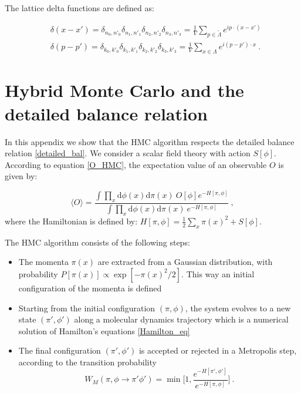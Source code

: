 The lattice delta functions are defined as:

\begin{equation}
\begin{split}
& \delta(x-x') =  \delta_{n_0,n'_0} \delta_{n_1,n'_1} \delta_{n_2,n'_2} \delta_{n_3,n'_3} = \frac{1}{V} \sum_{p \in \tilde\Lambda}
e^{i p \cdot (x - x')} \\
& \delta(p-p') =  \delta_{k_0,k'_0}\delta_{k_1,k'_1} \delta_{k_2,k'_2} \delta_{k_3,k'_3} = \frac{1}{V} \sum_{x \in \Lambda} 
e^{i (p - p') \cdot x } \: .
\end{split}
\end{equation}

\section{Hybrid Monte Carlo and the detailed balance relation}
\label{HMC_db}

In this appendix we show that the HMC algorithm respects the detailed balance relation \ref{detailed_bal}. We consider a scalar field theory with action $S[\phi]$. According to equation \ref{O_HMC}, the expectation value of an observable $O$ is given by:

\begin{equation}
\langle O \rangle = \frac{\int \prod_{x} \mathrm{d} \phi(x) \mathrm{d} \pi(x) \: O[\phi] e^{-H[\pi,\phi] }}{\int \prod_{x} \mathrm{d} \phi(x) \mathrm{d} \pi(x) \: e^{-H[\pi,\phi]}} \: ,
\end{equation}
%
where the Hamiltonian is defined by: $H[\pi,\phi] =  \frac{1}{2} \sum_x \pi(x)^2 + S[\phi]$.

 The HMC algorithm consists of the following steps:

\begin{itemize}
\item The momenta $\pi(x)$ are extracted from a Gaussian distribution, with probability $P[\pi(x)] \propto \exp[-\pi(x)^2/2]$. This way an initial configuration of the momenta is defined
\item Starting from the initial configuration $(\pi, \phi)$, the system evolves to a new state $(\pi',\phi')$ along a molecular dynamics trajectory which is a numerical solution of Hamilton's equations \ref{Hamilton_eq}
\item The final configuration $(\pi',\phi')$ is accepted or rejected in a Metropolis step, according to the transition probability 
\begin{equation}
W_M(\pi, \phi \to \pi' \phi') = \min \biggl[ 1, \frac{e^{-H[\pi',\phi']}}{e^{-H[\pi,\phi]}} \biggr] \: .
\end{equation}
\end{itemize}

